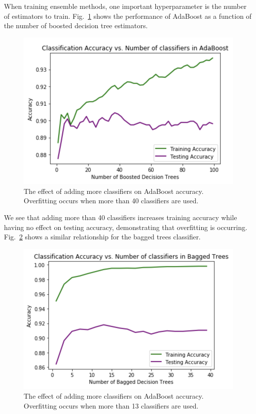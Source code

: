 \documentclass[conference]{IEEEtran}
\begin{document}
When training ensemble methods, one important hyperparameter is the number of estimators to train. Fig.~\ref{num} shows the performance of AdaBoost as a function of the number of boosted decision tree estimators.
\begin{figure}[htbp]
\centerline{\includegraphics[scale=0.6]{num_boosted}}
\caption{The effect of adding more classifiers on AdaBoost accuracy. Overfitting occurs when more than 40 classifiers are used.}
\label{num}
\end{figure}
We see that adding more than 40 classifiers increases training accuracy while having no effect on testing accuracy, demonstrating that overfitting is occurring. Fig.~\ref{bag} shows a similar relationship for the bagged trees classifier.
\begin{figure}[htbp]
\centerline{\includegraphics[scale=0.6]{num_bagged}}
\caption{The effect of adding more classifiers on AdaBoost accuracy. Overfitting occurs when more than 13 classifiers are used.}
\label{bag}
\end{figure}
\end{document}
